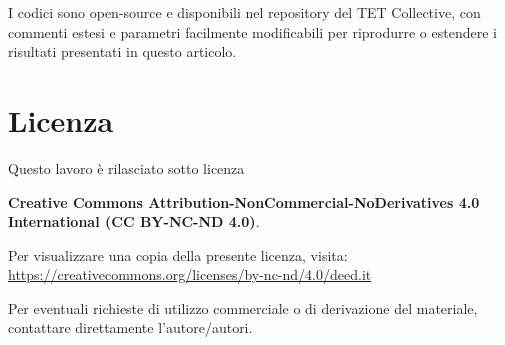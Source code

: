 \documentclass[11pt,a4paper]{article}
\theoremstyle{plain}
\theoremstyle{definition}
\begin{document}
\vspace{0.4cm}

I codici sono open-source e disponibili nel repository del TET Collective, con commenti estesi e parametri facilmente modificabili per riprodurre o estendere i risultati presentati in questo articolo.





\clearpage


\printbibliography



\clearpage


\section{Licenza}

Questo lavoro è rilasciato sotto licenza 

\textbf{Creative Commons Attribution-NonCommercial-NoDerivatives 4.0 International (CC BY-NC-ND 4.0)}.

Per visualizzare una copia della presente licenza, visita:\\
\url{https://creativecommons.org/licenses/by-nc-nd/4.0/deed.it}

Per eventuali richieste di utilizzo commerciale o di derivazione del materiale, contattare direttamente l'autore/autori.
\end{document}
